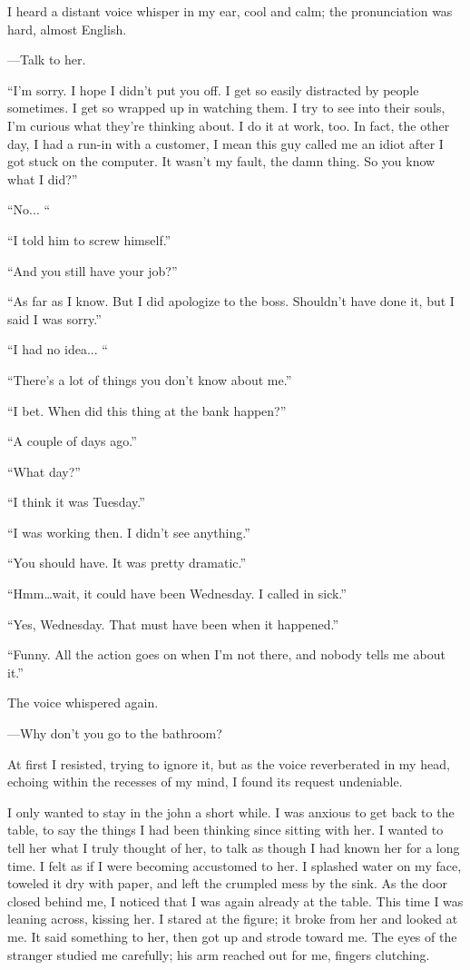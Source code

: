 I heard a distant voice whisper in my ear, cool and calm; the
pronunciation was hard, almost English.

---Talk to her.

``I'm sorry. I hope I didn't put you off. I get so easily distracted by
people sometimes. I get so wrapped up in watching them. I try to see
into their souls, I'm curious what they're thinking about. I do it at
work, too. In fact, the other day, I had a run-in with a customer, I
mean this guy called me an idiot after I got stuck on the computer. It
wasn't my fault, the damn thing. So you know what I did?''

``No... ``

``I told him to screw himself.''

``And you still have your job?''

``As far as I know. But I did apologize to the boss. Shouldn't have done
it, but I said I was sorry.''

``I had no idea... ``

``There's a lot of things you don't know about me.''

``I bet. When did this thing at the bank happen?''

``A couple of days ago.''

``What day?''

``I think it was Tuesday.''

``I was working then. I didn't see anything.''

``You should have. It was pretty dramatic.''

``Hmm\ldots wait, it could have been Wednesday. I called in sick.''

``Yes, Wednesday. That must have been when it happened.''

``Funny. All the action goes on when I'm not there, and nobody tells me
about it.''

The voice whispered again.

---Why don't you go to the bathroom?

At first I resisted, trying to ignore it, but as the voice reverberated
in my head, echoing within the recesses of my mind, I found its request
undeniable.

I only wanted to stay in the john a short while. I was anxious to get
back to the table, to say the things I had been thinking since sitting
with her. I wanted to tell her what I truly thought of her, to talk as
though I had known her for a long time. I felt as if I were becoming
accustomed to her. I splashed water on my face, toweled it dry with
paper, and left the crumpled mess by the sink. As the door closed behind
me, I noticed that I was again already at the table. This time I was
leaning across, kissing her. I stared at the figure; it broke from her
and looked at me. It said something to her, then got up and strode
toward me. The eyes of the stranger studied me carefully; his arm
reached out for me, fingers clutching.


